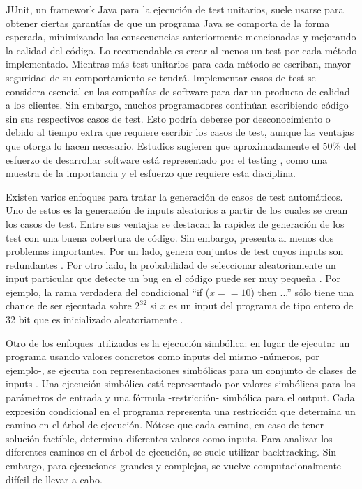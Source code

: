 \documentclass{llncs}
\begin{document}
JUnit, un framework Java para la ejecución de test unitarios, suele usarse para obtener ciertas garantías de que un programa Java se comporta de la forma esperada,
minimizando las consecuencias anteriormente mencionadas y mejorando la calidad del código. Lo recomendable es crear al menos un test por cada método implementado.
Mientras más test unitarios para cada método se escriban, mayor seguridad de su comportamiento se tendrá.
Implementar casos de test se considera esencial en las compañías de software para dar un producto de calidad a los clientes. Sin embargo, muchos programadores continúan escribiendo
código sin sus respectivos casos de test. Esto podría deberse por desconocimiento o debido al tiempo extra que requiere escribir los casos de test, aunque las ventajas que otorga
lo hacen necesario. Estudios sugieren que aproximadamente el 50\% del esfuerzo de desarrollar software está representado por el testing \cite{econImpact}, como una muestra de la
importancia y el esfuerzo que requiere esta disciplina.

Existen varios enfoques para tratar la generación de casos de test automáticos. Uno de estos es la generación de inputs aleatorios a partir de los cuales se crean los casos de test.
Entre sus ventajas se destacan la rapidez de generación de los test con una buena cobertura de código. Sin embargo, presenta al menos dos problemas importantes.
Por un lado, genera conjuntos de test cuyos inputs son redundantes \cite{cute}. Por otro lado, la probabilidad de seleccionar aleatoriamente un input particular que detecte un bug
en el código puede ser muy pequeña \cite{cute}. Por ejemplo, la rama verdadera del condicional “if ($x==10$) then ...” sólo tiene una chance de ser ejecutada sobre \(2^{32}\) si $x$
es un input del programa de tipo entero de 32 bit que es inicializado aleatoriamente \cite{dart}.

Otro de los enfoques utilizados es la ejecución simbólica: en lugar de ejecutar un programa usando valores concretos como inputs del mismo -números, por ejemplo-, se ejecuta con
representaciones simbólicas para un conjunto de clases de inputs \cite{symb}. Una ejecución simbólica está representado por valores simbólicos para los parámetros de entrada y una
fórmula -restricción- simbólica para el output. Cada expresión condicional en el programa representa una restricción que determina un camino en el árbol de ejecución.
Nótese que cada camino, en caso de tener solución factible, determina diferentes valores como inputs. Para analizar los diferentes caminos en el árbol de ejecución, se suele utilizar
backtracking. Sin embargo, para ejecuciones grandes y complejas, se vuelve computacionalmente difícil de llevar a cabo.
\end{document}
